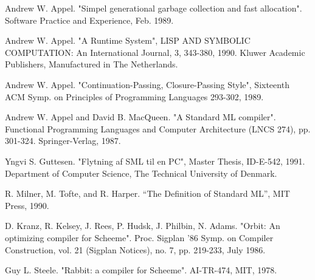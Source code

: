 \begin{thebibliography}{99}

 Andrew W. Appel. "Simpel generational garbage collection and fast
 allocation". Software Practice and Experience, Feb. 1989.

 Andrew W. Appel. "A Runtime System", LISP AND SYMBOLIC COMPUTATION:
 An International Journal, 3, 343-380, 1990. Kluwer Academic Publishers,
 Manufactured in The Netherlands.

 Andrew W. Appel. "Continuation-Passing, Closure-Passing Style",
 Sixteenth ACM Symp. on Principles of Programming Languages 293-302, 1989.

 Andrew W. Appel and David B. MacQueen. "A Standard ML compiler".
 Functional Programming Languages and Computer Architecture (LNCS 274),
 pp. 301-324. Springer-Verlag, 1987.

 Yngvi S. Guttesen. "Flytning af SML til en PC", Master Thesis, ID-E-542,
 1991. Department of Computer Science, The Technical University of
 Denmark.

 R. Milner, M. Tofte, and R. Harper. ``The Definition of Standard
 ML'', MIT Press, 1990.

 D. Kranz, R. Kelsey, J. Rees, P. Hudsk, J. Philbin, N. Adams. "Orbit: An
 optimizing compiler for Scheeme". Proc. Sigplan '86 Symp. on Compiler
 Construction, vol. 21 (Sigplan Notices), no. 7, pp. 219-233, July 1986.

 Guy L. Steele. "Rabbit: a compiler for Scheeme". AI-TR-474, MIT, 1978.


\end{thebibliography}



